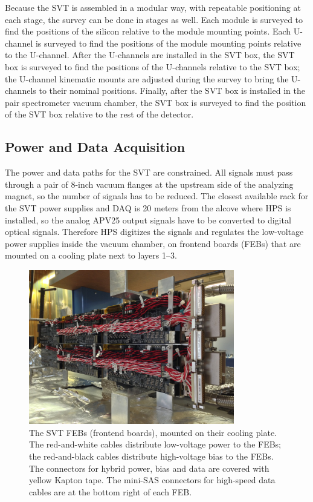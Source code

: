 Because the SVT is assembled in a modular way, with repeatable positioning at each stage, the survey can be done in stages as well.
Each module is surveyed to find the positions of the silicon relative to the module mounting points.
Each U-channel is surveyed to find the positions of the module mounting points relative to the U-channel.
After the U-channels are installed in the SVT box, the SVT box is surveyed to find the positions of the U-channels relative to the SVT box; the U-channel kinematic mounts are adjusted during the survey to bring the U-channels to their nominal positions.
Finally, after the SVT box is installed in the pair spectrometer vacuum chamber, the SVT box is surveyed to find the position of the SVT box relative to the rest of the detector.

\subsection{Power and Data Acquisition}
\label{sec:power_daq}
The power and data paths for the SVT are constrained.
All signals must pass through a pair of 8-inch vacuum flanges at the upstream side of the analyzing magnet, so the number of signals has to be reduced.
The closest available rack for the SVT power supplies and DAQ is 20 meters from the alcove where HPS is installed, so the analog APV25 output signals have to be converted to digital optical signals.
Therefore HPS digitizes the signals and regulates the low-voltage power supplies inside the vacuum chamber, on frontend boards (FEBs) that are mounted on a cooling plate next to layers 1--3.

\begin{figure}[htp]
    \begin{center}
    \includegraphics[width=0.8\textwidth]{detector/figs/febplate}
    \end{center}
    \caption{The SVT FEBs (frontend boards), mounted on their cooling plate. The red-and-white cables distribute low-voltage power to the FEBs; the red-and-black cables distribute high-voltage bias to the FEBs. The connectors for hybrid power, bias and data are covered with yellow Kapton tape. The mini-SAS connectors for high-speed data cables are at the bottom right of each FEB.}
    \label{fig:febplate}
\end{figure}

